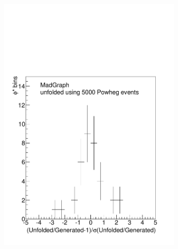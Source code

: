 \begin{figure}[!htbp]
\begin{subfigure}[b]{\SideBySidePlotWidth}
        \includegraphics[width=\textwidth]{figures/Pull_5000.pdf}
        \caption{}
        \label{fig:pull_5000}
    \end{subfigure}
    \begin{subfigure}[b]{\SideBySidePlotWidth}

\end{subfigure}
\end{figure}
